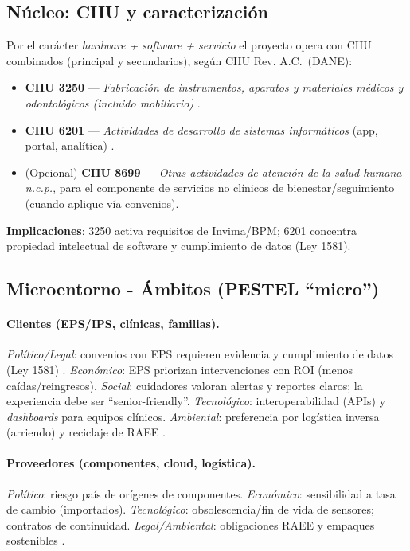 \subsection{Núcleo: CIIU y caracterización}
Por el carácter \emph{hardware + software + servicio} el proyecto opera con CIIU combinados (principal y secundarios), según CIIU Rev. A.C.\ (DANE):
\begin{itemize}
    \item \textbf{CIIU 3250} — \emph{Fabricación de instrumentos, aparatos y materiales médicos y odontológicos (incluido mobiliario)} \cite{DANE_CIIU}. 
    \item \textbf{CIIU 6201} — \emph{Actividades de desarrollo de sistemas informáticos} (app, portal, analítica) \cite{DIAN_CIIU6201}. 
    \item (Opcional) \textbf{CIIU 8699} — \emph{Otras actividades de atención de la salud humana n.c.p.}, para el componente de servicios no clínicos de bienestar/seguimiento (cuando aplique vía convenios).
\end{itemize}
\textbf{Implicaciones}: 3250 activa requisitos de Invima/BPM; 6201 concentra propiedad intelectual de software y cumplimiento de datos (Ley 1581).

\subsection{Microentorno - Ámbitos (PESTEL “micro”)}

\paragraph{Clientes (EPS/IPS, clínicas, familias).}
\emph{Político/Legal}: convenios con EPS requieren evidencia y cumplimiento de datos (Ley 1581) \cite{Ley1581Datos}.
\emph{Económico}: EPS priorizan intervenciones con ROI (menos caídas/reingresos).
\emph{Social}: cuidadores valoran alertas y reportes claros; la experiencia debe ser “senior-friendly”.
\emph{Tecnológico}: interoperabilidad (APIs) y \emph{dashboards} para equipos clínicos.
\emph{Ambiental}: preferencia por logística inversa (arriendo) y reciclaje de RAEE \cite{Ley1672RAEE,Resolucion1512RAEE}. 

\paragraph{Proveedores (componentes, cloud, logística).}
\emph{Político}: riesgo país de orígenes de componentes.
\emph{Económico}: sensibilidad a tasa de cambio (importados).
\emph{Tecnológico}: obsolescencia/fin de vida de sensores; contratos de continuidad.
\emph{Legal/Ambiental}: obligaciones RAEE y empaques sostenibles \cite{Ley1672RAEE,Resolucion1512RAEE}.

